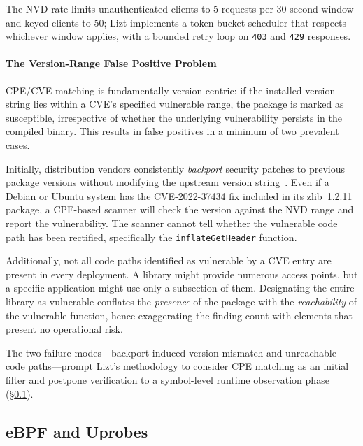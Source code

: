 \documentclass[conference]{IEEEtran}
\begin{document}
The NVD rate-limits unauthenticated clients to 5 requests per 30-second window and keyed clients to 50; Lizt implements a token-bucket scheduler that respects whichever window applies, with a bounded retry loop on \texttt{403} and \texttt{429} responses.

\paragraph{The Version-Range False Positive Problem}

CPE/CVE matching is fundamentally version-centric: if the installed version string lies within a CVE's specified vulnerable range, the package is marked as susceptible, irrespective of whether the underlying vulnerability persists in the compiled binary.
This results in false positives in a minimum of two prevalent cases.

Initially, distribution vendors consistently \textit{backport} security patches to previous package versions without modifying the upstream version string~\cite{redhat_backporting}.
Even if a Debian or Ubuntu system has the CVE-2022-37434 fix included in its zlib~1.2.11 package, a CPE-based scanner will check the version against the NVD range and report the vulnerability.
The scanner cannot tell whether the vulnerable code path has been rectified, specifically the \texttt{inflateGetHeader} function.

Additionally, not all code paths identified as vulnerable by a CVE entry are present in every deployment.
A library might provide numerous access points, but a specific application might use only a subsection of them.
Designating the entire library as vulnerable conflates the \textit{presence} of the package with the \textit{reachability} of the vulnerable function, hence exaggerating the finding count with elements that present no operational risk.

The two failure modes---backport-induced version mismatch and unreachable code paths---prompt Lizt's methodology to consider CPE matching as an initial filter and postpone verification to a symbol-level runtime observation phase (\S\ref{sec:ebpf}).

\subsection{eBPF and Uprobes}
\label{sec:ebpf}
\end{document}
